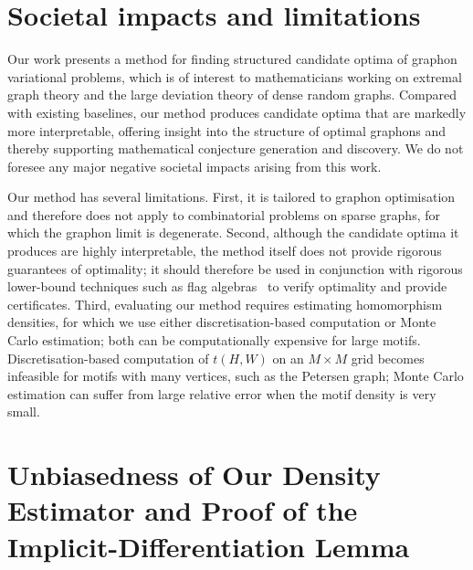 \documentclass{article}
\theoremstyle{plain}
\theoremstyle{definition}
\theoremstyle{remark}
\begin{document}
\section{Societal impacts and limitations}

Our work presents a method for finding structured candidate optima of graphon variational problems, which is of interest to mathematicians working on extremal graph theory and the large deviation theory of dense random graphs.
Compared with existing baselines, our method produces candidate optima that are markedly more interpretable, offering insight into the structure of optimal graphons and thereby supporting mathematical conjecture generation and discovery.
We do not foresee any major negative societal impacts arising from this work.

Our method has several limitations.
First, it is tailored to graphon optimisation and therefore does not apply to combinatorial problems on sparse graphs, for which the graphon limit is degenerate.
Second, although the candidate optima it produces are highly interpretable, the method itself does not provide rigorous guarantees of optimality; it should therefore be used in conjunction with rigorous lower-bound techniques such as flag algebras~\citep{razborov2007flag,falgas2013applications} to verify optimality and provide certificates.
Third, evaluating our method requires estimating homomorphism densities, for which we use either discretisation-based computation or Monte Carlo estimation; both can be computationally expensive for large motifs.
Discretisation-based computation of $t(H, W)$ on an $M \times M$ grid becomes infeasible for motifs with many vertices, such as the Petersen graph; Monte Carlo estimation can suffer from large relative error when the motif density is very small.


\section{Unbiasedness of Our Density Estimator and Proof of the Implicit-Differentiation Lemma}
\end{document}
